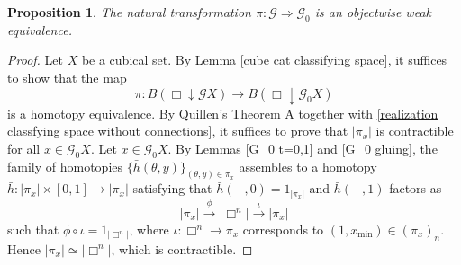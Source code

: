 \documentclass[oneside, 12pt]{amsart}
\numberwithin{equation}{section}
\theoremstyle{plain}
\newtheorem{proposition}[theorem]{Proposition}
\theoremstyle{definition}
\theoremstyle{remark}
\begin{document}
	
	
	
	
	
	
	\begin{proposition}
		\label{G_0}
		The natural transformation $\pi\colon\mathcal{G}\Rightarrow\mathcal{G}_0$ is an objectwise weak equivalence.
	\end{proposition}
	
	\begin{proof}
		Let $X$ be a cubical set. By Lemma \ref{cube cat classifying space}, it suffices to show that the map
		\[
		\pi\colon B(\Box\downarrow\mathcal{G}X)\to B(\Box\downarrow\mathcal{G}_0X)
		\]
		is a homotopy equivalence. By Quillen's Theorem A together with \eqref{realization classfying space without connections}, it suffices to prove that $|\pi_x|$ is contractible for all $x\in\mathcal{G}_0X$. Let $x\in\mathcal{G}_0X$. By Lemmas \ref{G_0 t=0,1} and \ref{G_0 gluing}, the family of homotopies $\{\bar{h}(\theta,y)\}_{(\theta,y)\in\pi_x}$ assembles to a homotopy $\bar{h}\colon|\pi_x|\times[0,1]\to|\pi_x|$ satisfying that $\bar{h}(-,0)=1_{|\pi_x|}$ and $\bar{h}(-,1)$ factors as
		\[
		|\pi_x|\xrightarrow{\phi}|\Box^n|\xrightarrow{\iota}|\pi_x|
		\]
		such that $\phi\circ\iota=1_{|\Box^n|}$, where $\iota\colon\Box^n\to\pi_x$ corresponds to $(1,x_\mathrm{min})\in(\pi_x)_n$. Hence $|\pi_x|\simeq|\Box^n|$, which is contractible.
	\end{proof}
	
\end{document}

